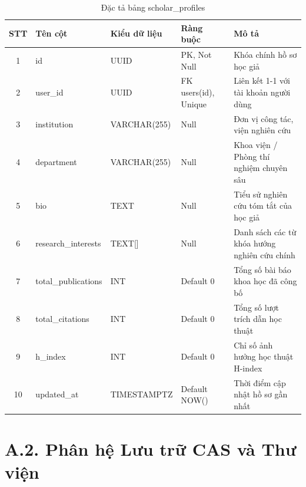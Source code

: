 \begin{table}[H]
\centering
\singlespacing
\fontsize{9pt}{11.5pt}\selectfont
\caption{Đặc tả bảng scholar\_profiles}
\label{tab:app_scholar_profiles}
\renewcommand{\arraystretch}{0.65}
\begin{tabularx}{\textwidth}{|c|>{\raggedright\arraybackslash}p{3.2cm}|>{\raggedright\arraybackslash}p{2.6cm}|>{\raggedright\arraybackslash}p{3.0cm}|>{\raggedright\arraybackslash}X|}
\hline
\textbf{STT} & \centering\textbf{Tên cột} & \centering\textbf{Kiểu dữ liệu} & \centering\textbf{Ràng buộc} & \centering\textbf{Mô tả} \tabularnewline \hline
1 & id & UUID & PK, Not Null & Khóa chính hồ sơ học giả \tabularnewline \hline
2 & user\_id & UUID & FK users(id), Unique & Liên kết 1-1 với tài khoản người dùng \tabularnewline \hline
3 & institution & VARCHAR(255) & Null & Đơn vị công tác, viện nghiên cứu \tabularnewline \hline
4 & department & VARCHAR(255) & Null & Khoa viện / Phòng thí nghiệm chuyên sâu \tabularnewline \hline
5 & bio & TEXT & Null & Tiểu sử nghiên cứu tóm tắt của học giả \tabularnewline \hline
6 & research\_interests & TEXT[] & Null & Danh sách các từ khóa hướng nghiên cứu chính \tabularnewline \hline
7 & total\_publications & INT & Default 0 & Tổng số bài báo khoa học đã công bố \tabularnewline \hline
8 & total\_citations & INT & Default 0 & Tổng số lượt trích dẫn học thuật \tabularnewline \hline
9 & h\_index & INT & Default 0 & Chỉ số ảnh hưởng học thuật H-index \tabularnewline \hline
10 & updated\_at & TIMESTAMPTZ & Default NOW() & Thời điểm cập nhật hồ sơ gần nhất \tabularnewline \hline
\end{tabularx}
\end{table}

\section*{A.2. Phân hệ Lưu trữ CAS và Thư viện}

